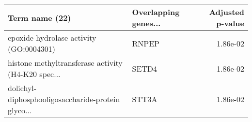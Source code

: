 \begin{tabular}{llr}
\toprule
                                    Term name (22) & Overlapping genes... &  Adjusted p-value \\
\midrule
           epoxide hydrolase activity (GO:0004301) &                RNPEP &          1.86e-02 \\
histone methyltransferase activity (H4-K20 spec... &                SETD4 &          1.86e-02 \\
dolichyl-diphosphooligosaccharide-protein glyco... &                STT3A &          1.86e-02 \\
\bottomrule
\end{tabular}
